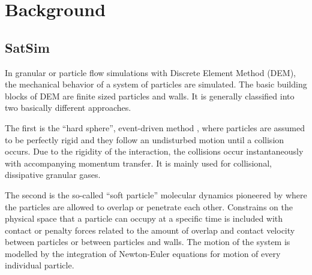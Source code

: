 \chapter{Background}
\label{chp:back}


\section{SatSim}

In granular or particle flow simulations with Discrete Element Method (DEM),
the mechanical behavior of a system of particles are simulated. The basic
building blocks of DEM are finite sized particles and walls. It is generally
classified into two basically different approaches.

The first is the ``hard sphere'', event-driven method
\citep[e.g.][]{Luding-1994, Luding-2004}, where particles are assumed to be
perfectly rigid and they follow an undisturbed motion until a collision
occurs. Due to the rigidity of the interaction, the collisions occur
instantaneously with accompanying momentum transfer. It is mainly used for
collisional, dissipative granular gases.

The second is the so-called ``soft particle'' molecular dynamics pioneered by
\citet{Cundall-1979} 
where the particles are allowed to overlap or penetrate
each other. Constrains on the physical space that a particle can occupy at a
specific time is included with contact or penalty forces related to the
amount of overlap and contact velocity between particles or between particles
and walls. The motion of the system is modelled by the integration of
Newton-Euler equations for motion of every individual particle.
